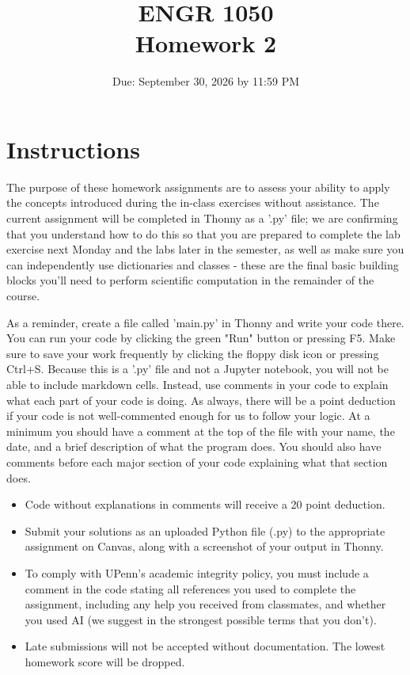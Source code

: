 \documentclass[12pt]{article}
\title{ENGR 1050 \\ Homework 2}
\author{Due: September 30, 2026 by 11:59 PM}
\date{}
\begin{document}
\maketitle

\section*{Instructions}
The purpose of these homework assignments are to assess your ability to apply the concepts introduced during the in-class exercises without assistance. The current assignment will be completed in Thonny as a '.py' file; we are confirming that you understand how to do this so that you are prepared to complete the lab exercise next Monday and the labs later in the semester, as well as make sure you can independently use dictionaries and classes - these are the final basic building blocks you'll need to perform scientific computation in the remainder of the course.

As a reminder, create a file called 'main.py' in Thonny and write your code there. You can run your code by clicking the green "Run" button or pressing F5. Make sure to save your work frequently by clicking the floppy disk icon or pressing Ctrl+S. Because this is a '.py' file and not a Jupyter notebook, you will not be able to include markdown cells. Instead, use comments in your code to explain what each part of your code is doing. As always, there will be a point deduction if your code is not well-commented enough for us to follow your logic. At a minimum you should have a comment at the top of the file with your name, the date, and a brief description of what the program does. You should also have comments before each major section of your code explaining what that section does.

\begin{itemize}
    \item Code without explanations in comments will receive a 20 point deduction.
    \item Submit your solutions as an uploaded Python file (.py) to the appropriate assignment on Canvas, along with a screenshot of your output in Thonny.
    \item To comply with UPenn's academic integrity policy, you must include a comment in the code stating all references you used to complete the assignment, including any help you received from classmates, and whether you used AI (we suggest in the strongest possible terms that you don't). 
    \item Late submissions will not be accepted without documentation. The lowest homework score will be dropped.
\end{itemize}
\end{document}
